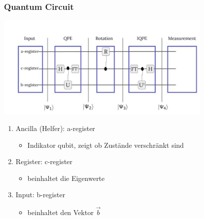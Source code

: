 \begin{frame}
    \frametitle{Quantum Circuit}
    \begin{center}
    \includegraphics[width=10.5cm]{img/hhl_circuit/hhl_circuit.jpg}
    \end{center}
    \begin{enumerate}
        \item Ancilla (Helfer): a-register
        \begin{itemize}
            \item Indikator qubit, zeigt ob Zustände verschränkt sind
        \end{itemize}

        \item Register: c-register
        \begin{itemize}
            \item beinhaltet die Eigenwerte
        \end{itemize}
        
        \item Input: b-register 
        \begin{itemize}
            \item beinhaltet den Vektor $\vec{b}$
        \end{itemize}
        
    \end{enumerate}
   \end{frame}
